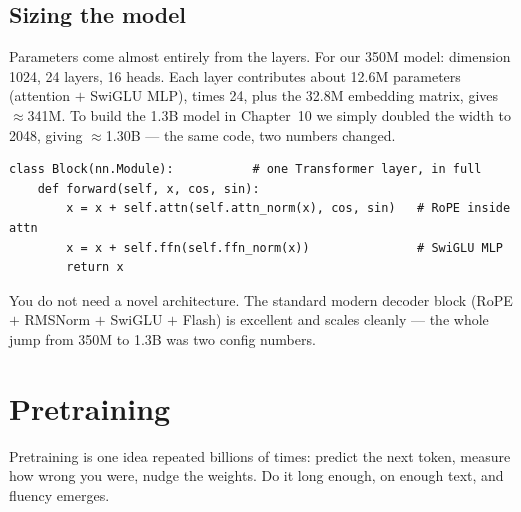 

\section{Sizing the model}
Parameters come almost entirely from the layers. For our 350M model: dimension 1024, 24 layers, 16 heads. Each
layer contributes about 12.6M parameters (attention $+$ SwiGLU MLP), times 24, plus the 32.8M embedding
matrix, gives $\approx$341M. To build the 1.3B model in Chapter~10 we simply doubled the width to 2048,
giving $\approx$1.30B --- the same code, two numbers changed.

\begin{lstlisting}
class Block(nn.Module):           # one Transformer layer, in full
    def forward(self, x, cos, sin):
        x = x + self.attn(self.attn_norm(x), cos, sin)   # RoPE inside attn
        x = x + self.ffn(self.ffn_norm(x))               # SwiGLU MLP
        return x
\end{lstlisting}

\begin{lesson}
You do not need a novel architecture. The standard modern decoder block (RoPE $+$ RMSNorm $+$ SwiGLU $+$
Flash) is excellent and scales cleanly --- the whole jump from 350M to 1.3B was two config numbers.
\end{lesson}

\chapter{Pretraining}

Pretraining is one idea repeated billions of times: predict the next token, measure how wrong you were, nudge
the weights. Do it long enough, on enough text, and fluency emerges.

